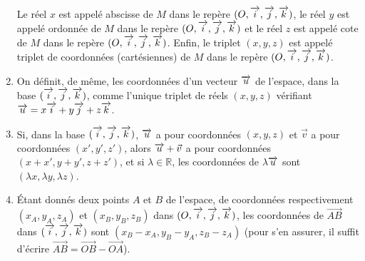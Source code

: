 \documentclass[10pt,oneside]{article}
\begin{document}
\begin{rem}
\begin{enumerate}
Le réel $x$ est appelé abscisse de $M$ dans le repère $(O,\overrightarrow{i}, \overrightarrow{j}, \overrightarrow{k})$, le réel $y$ est appelé ordonnée de $M$ dans le repère $(O,\overrightarrow{i}, \overrightarrow{j}, \overrightarrow{k})$ et le réel $z$ est appelé cote de $M$ dans le repère $(O, \overrightarrow{i}, \overrightarrow{j}, \overrightarrow{k})$. Enfin, le triplet $(x,y,z)$ est appelé triplet de coordonnées (cartésiennes) de $M$ dans le repère $(O,\overrightarrow{i}, \overrightarrow{j}, \overrightarrow{k})$.
\item On définit, de même, les coordonnées d'un vecteur $\overrightarrow{u}$ de l'espace, dans la base $(\overrightarrow{i}, \overrightarrow{j}, \overrightarrow{k})$, comme l'unique triplet de réels $(x,y,z)$ vérifiant $\overrightarrow{u}=x\overrightarrow{i}+y\overrightarrow{j}+z\overrightarrow{k}$.
\item Si, dans la base $(\overrightarrow{i}, \overrightarrow{j}, \overrightarrow{k})$, $\overrightarrow{u}$ a pour coordonnées $(x,y,z)$ et $\vec v$ a pour coordonnées $(x',y',z')$, alors $\overrightarrow{u}+\vec v$ a pour coordonnées $(x+x',y+y',z+z')$, et si $\lambda \in \mathbb{R}$, les coordonnées de $\lambda \overrightarrow{u}$ sont $(\lambda x,\lambda y, \lambda z)$.
\item Étant donnés deux points $A$ et $B$ de l'espace, de coordonnées respectivement $(x_A,y_A,z_A)$ et $(x_B,y_B,z_B)$ dans $(O,\overrightarrow{i}, \overrightarrow{j},\overrightarrow{k})$, les coordonnées de $\overrightarrow{AB}$ dans $(\overrightarrow{i}, \overrightarrow{j}, \overrightarrow{k})$ sont $(x_B-x_A,y_B-y_A,z_B-z_A)$ (pour s'en assurer, il suffit d'écrire $\overrightarrow{AB}=\overrightarrow{OB}-\overrightarrow{OA}$).


\end{enumerate}
\end{rem}
\end{document}
